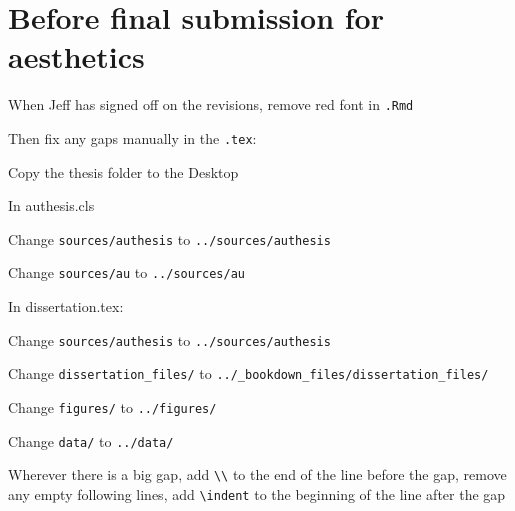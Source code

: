 \documentclass[12pt]{article}
\begin{document}
\section*{Before final submission for aesthetics}
	\begin{coi}
		\item When Jeff has signed off on the revisions, remove red font in \texttt{.Rmd} 
		\item Then fix any gaps manually in the \texttt{.tex}:
			\begin{coi}
				\item Copy the thesis folder to the Desktop
				\item In authesis.cls
					\begin{coi}
						\item Change \texttt{sources/authesis} to \texttt{../sources/authesis}
						\item Change \texttt{sources/au} to \texttt{../sources/au}
					\end{coi}
				\item In dissertation.tex:
					\begin{coi}
						\item Change \texttt{sources/authesis} to \texttt{../sources/authesis}
						\item Change \texttt{dissertation\_files/} to \texttt{../\_bookdown\_files/dissertation\_files/}
						\item Change \texttt{figures/} to \texttt{../figures/}
						\item Change \texttt{data/} to \texttt{../data/}
						\item Wherever there is a big gap, add \texttt{\textbackslash\textbackslash} to the end of the line before the gap, remove any empty following lines, add \texttt{\textbackslash indent} to the beginning of the line after the gap
					\end{coi}
			\end{coi}
	\end{coi}
\end{document}
